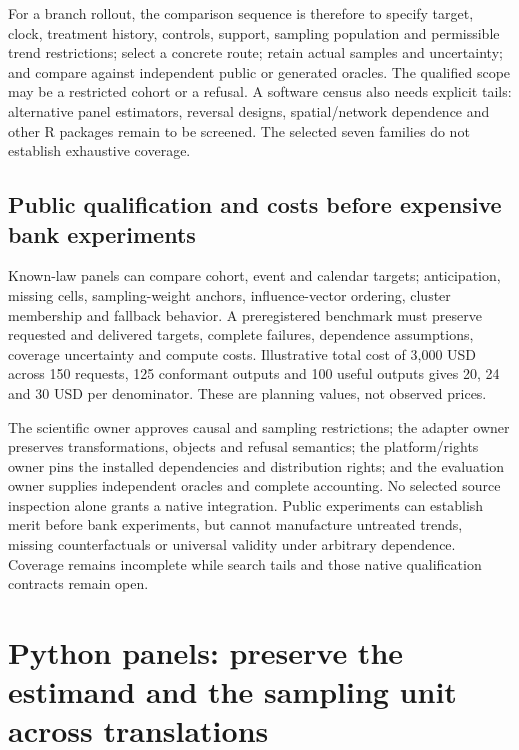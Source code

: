 For a branch rollout, the comparison sequence is therefore to specify target,
clock, treatment history, controls, support, sampling population and permissible
trend restrictions; select a concrete route; retain actual samples and
uncertainty; and compare against independent public or generated oracles.
The qualified scope may be a restricted cohort or a refusal. A software census
also needs explicit tails: alternative panel estimators, reversal designs,
spatial/network dependence and other R packages remain to be screened. The
selected seven families do not establish exhaustive coverage.
\citep{exec24_panelr_contract}

\subsection{Public qualification and costs before expensive bank experiments}
Known-law panels can compare cohort, event and calendar targets; anticipation,
missing cells, sampling-weight anchors, influence-vector ordering, cluster
membership and fallback behavior. A preregistered benchmark must preserve
requested and delivered targets, complete failures, dependence assumptions,
coverage uncertainty and compute costs. Illustrative total cost of 3,000 USD
across 150 requests, 125 conformant outputs and 100 useful outputs gives 20,
24 and 30 USD per denominator. These are planning values, not observed prices.
\citep{exec24_panelr_contract}

The scientific owner approves causal and sampling restrictions; the adapter
owner preserves transformations, objects and refusal semantics; the
platform/rights owner pins the installed dependencies and distribution rights;
and the evaluation owner supplies independent oracles and complete accounting.
No selected source inspection alone grants a native integration. Public
experiments can establish merit before bank experiments, but cannot manufacture
untreated trends, missing counterfactuals or universal validity under arbitrary
dependence. Coverage remains incomplete while search tails and those native
qualification contracts remain open.
\citep{exec24_panelr_contract}


\section{Python panels: preserve the estimand and the sampling unit across translations}
\label{sec:exec24-panels-python}


